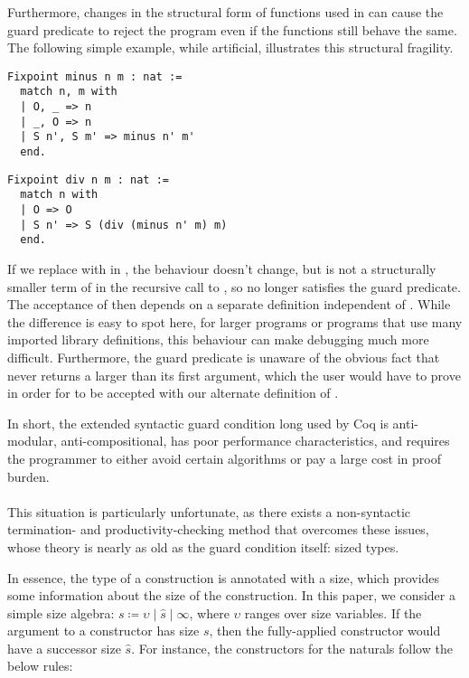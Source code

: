 Furthermore, changes in the structural form of functions used in \cofixpoints can cause the guard predicate to reject the program even if the functions still behave the same.
The following simple example, while artificial, illustrates this structural fragility.
\begin{verbatim}
Fixpoint minus n m : nat :=
  match n, m with
  | O, _ => n
  | _, O => n
  | S n', S m' => minus n' m'
  end.
\end{verbatim}
\begin{verbatim}
Fixpoint div n m : nat :=
  match n with
  | O => O
  | S n' => S (div (minus n' m) m)
  end.
\end{verbatim}

If we replace  with  in , the behaviour doesn't change, but  is not a structurally smaller term of  in the recursive call to , so  no longer satisfies the guard predicate.
The acceptance of  then depends on a separate definition independent of .
While the difference is easy to spot here, for larger programs or programs that use many imported library definitions,
this behaviour can make debugging much more difficult.
Furthermore, the guard predicate is unaware of the obvious fact that  never returns a  larger than its first argument, which the user would have to prove in order for  to be accepted with our alternate definition of .

In short, the extended syntactic guard condition long used by Coq is anti-modular, anti-compositional, has poor performance characteristics, and requires the programmer to either avoid certain algorithms or pay a large cost in proof burden.

\paragraph*{} This situation is particularly unfortunate, as there exists a non-syntactic termination- and productivity-checking method that overcomes these issues,
whose theory is nearly as old as the guard condition itself: sized types.

In essence, the \coinductive type of a construction is annotated with a size, which provides some information about the size of the construction.
In this paper, we consider a simple size algebra: \mbox{$s \coloneqq \upsilon \mid \hat{s} \mid \infty$}, where $\upsilon$ ranges over size variables.
If the argument to a constructor has size $s$, then the fully-applied constructor would have a successor size $\hat{s}$.
For instance, the constructors for the naturals follow the below rules:

